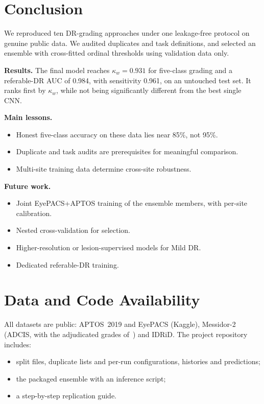 \documentclass[journal]{IEEEtran}
\begin{document}
\section{Conclusion}
We reproduced ten DR-grading approaches under one leakage-free protocol on genuine public data. We
audited duplicates and task definitions, and selected an ensemble with cross-fitted ordinal thresholds
using validation data only.

\textbf{Results.} The final model reaches $\kappa_w=0.931$ for five-class grading and a referable-DR
AUC of 0.984, with sensitivity 0.961, on an untouched test set. It ranks first by $\kappa_w$, while not
being significantly different from the best single CNN.

\textbf{Main lessons.}
\begin{itemize}
\item Honest five-class accuracy on these data lies near 85\%, not 95\%.
\item Duplicate and task audits are prerequisites for meaningful comparison.
\item Multi-site training data determine cross-site robustness.
\end{itemize}

\textbf{Future work.}
\begin{itemize}
\item Joint EyePACS+APTOS training of the ensemble members, with per-site calibration.
\item Nested cross-validation for selection.
\item Higher-resolution or lesion-supervised models for Mild DR.
\item Dedicated referable-DR training.
\end{itemize}

\section*{Data and Code Availability}
All datasets are public: APTOS~2019 and EyePACS (Kaggle), Messidor-2 (ADCIS, with the adjudicated
grades of~\cite{krause2018grader}) and IDRiD. The project repository includes:
\begin{itemize}
\item split files, duplicate lists and per-run configurations, histories and predictions;
\item the packaged ensemble with an inference script;
\item a step-by-step replication guide.
\end{itemize}
\end{document}
